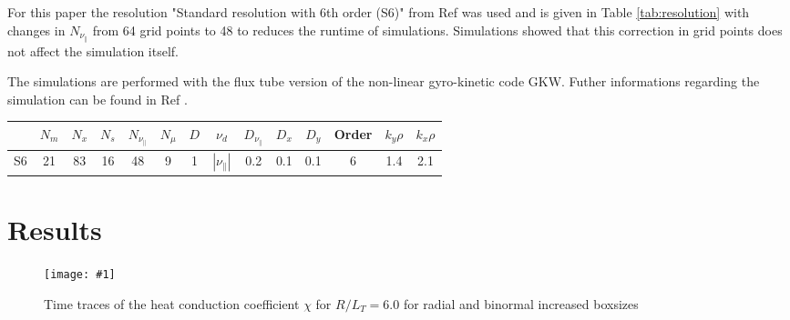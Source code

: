 \documentclass[aip, amsmath, amssymb, reprint, twocolumn]{revtex4-1}
\newcommand{\includegraphicsOneCol}[3]{
	\begin{figure}[ht]
		\texttt{[image: \#1]}
		\caption{#2}
  	\end{figure}
	\label{#3}
  	\increasecounter{fig}{1}
}
\begin{document}
For this paper the resolution "Standard resolution with 6th order (S6)" from Ref  was used and is given in Table \ref{tab:resolution} with changes in $N_{\nu_\parallel}$ from 64 grid points to 48 to reduces the runtime of simulations. Simulations showed that this correction in grid points does not affect the simulation itself.

The simulations are performed with the flux tube version of the non-linear gyro-kinetic code GKW.\cite{Peeters20092650}
Futher informations regarding the simulation can be found in Ref .

\begin{center}
	\captionsetup{type=table}
	\begin{ruledtabular}
		\begin{tabular}{l | ccccc | ccccc | c | cc}
			& $N_m$ & $N_x$ & $N_s$ & $N_{\nu_\parallel}$ & $N_\mu$ & $D$ & $\nu_d$           & $D_{\nu_\parallel}$ & $D_x$ & $D_y$ & Order & $k_y\rho$ & $k_x\rho$ \\
			\hline
			S6   & 21    & 83    & 16    & 48                  & 9       & 1   & $|\nu_\parallel|$ & 0.2                 & 0.1   & 0.1   & 6     & 1.4       & 2.1       \\
		\end{tabular}
	\end{ruledtabular}
	\label{tab:resolution}
\end{center}

\section{Results}
\label{sec:results}

\includegraphicsOneCol{Comparison/Boxsize/S6_rlt6.0_boxsize1x1-2x2-3x3_Ns16_Nvpar48_Nmu9_eflux_comparison.pdf}{
	Time traces of the heat conduction coefficient $\chi$ for $R/L_T = 6.0$ for radial and binormal increased boxsizes
}{fig:eflux-1x1-2x2-3x3-comparison}
\end{document}
